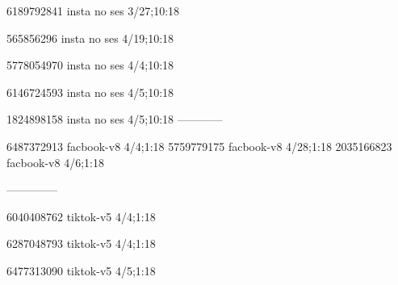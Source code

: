 6189792841 insta no ses
3/27;10:18

565856296 insta no ses
4/19;10:18

5778054970 insta no ses
4/4;10:18

6146724593 insta no ses
4/5;10:18

1824898158 insta no ses
4/5;10:18
------------

6487372913 facbook-v8
4/4;1:18
5759779175 facbook-v8
4/28;1:18
2035166823 facbook-v8
4/6;1:18

--------------

6040408762 tiktok-v5
4/4;1:18

6287048793 tiktok-v5
4/4;1:18

6477313090 tiktok-v5
4/5;1:18
